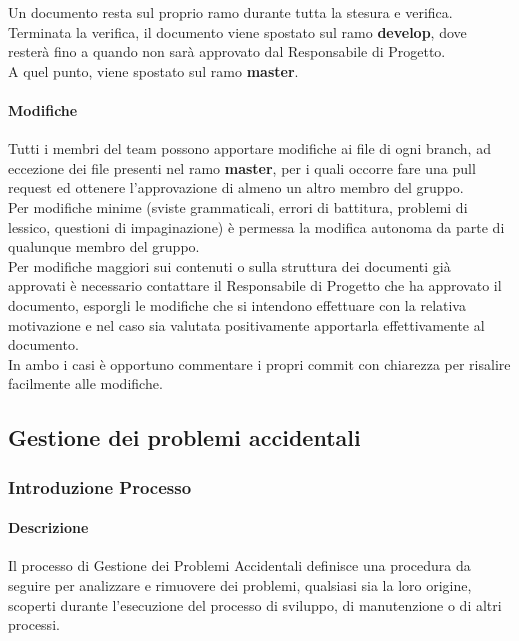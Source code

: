                 Un documento resta sul proprio ramo durante tutta la stesura e verifica.  \\
                Terminata la verifica, il documento viene spostato sul ramo \textbf{develop}, dove resterà fino a quando non sarà approvato dal Responsabile di Progetto. \\
                A quel punto, viene spostato sul ramo \textbf{master}.
                
            \paragraph{ Modifiche}
                Tutti i membri del team possono apportare modifiche ai file di ogni branch, ad eccezione dei file presenti nel ramo \textbf{master}, per i quali occorre fare una pull request ed ottenere l’approvazione di almeno un altro membro del gruppo. \\
                Per modifiche minime (sviste grammaticali, errori di battitura, problemi di lessico, questioni di impaginazione) è permessa la modifica autonoma da parte di qualunque membro del gruppo. \\
                Per modifiche maggiori sui contenuti o sulla struttura dei documenti già approvati è necessario contattare il Responsabile di Progetto che ha approvato il documento, esporgli le modifiche che si intendono effettuare con la relativa motivazione e nel caso sia valutata positivamente apportarla effettivamente al documento.\\
                In ambo i casi è opportuno commentare i propri commit con chiarezza per risalire facilmente alle modifiche.\\

    \subsection{Gestione dei problemi accidentali}
        \subsubsection{Introduzione Processo}
            \paragraph{Descrizione}
                Il processo di Gestione dei Problemi Accidentali definisce una procedura da seguire per analizzare e rimuovere dei problemi, qualsiasi sia la loro origine, scoperti durante l'esecuzione del processo di sviluppo, di manutenzione o di altri processi.
